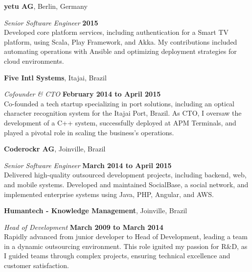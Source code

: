 \documentclass[12pt]{article}
\newcommand{\halfblankline}{\quad\vspace{-0.5\baselineskip}\pagebreak[3]}
\begin{document}
\textbf{yetu AG},
Berlin, Germany
\begin{outerlist}

    \item[] \textit{Senior Software Engineer}%
            \hfill \textbf{2015}\\
            Developed core platform services, including authentication for a Smart TV platform, using Scala, Play Framework, and Akka. My contributions included automating operations with Ansible and optimizing deployment strategies for cloud environments.

\end{outerlist}

\halfblankline

\textbf{Five Intl Systems},
Itajai, Brazil
\begin{outerlist}

    \item[] \textit{Cofounder \& CTO}%
            \hfill \textbf{February 2014 to April 2015}\\
            Co-founded a tech startup specializing in port solutions, including an optical character recognition system for the Itajai Port, Brazil. As CTO, I oversaw the development of a C++ system, successfully deployed at APM Terminals, and played a pivotal role in scaling the business's operations.
            
\end{outerlist}

\halfblankline

\textbf{Coderockr AG},
Joinville, Brazil
\begin{outerlist}

    \item[] \textit{Senior Software Engineer}%
            \hfill \textbf{March 2014 to April 2015}\\
            Delivered high-quality outsourced development projects, including backend, web, and mobile systems. Developed and maintained SocialBase, a social network, and implemented enterprise systems using Java, PHP, Angular, and AWS.
            
\end{outerlist}

\halfblankline

\textbf{Humantech - Knowledge Management},
Joinville, Brazil
\begin{outerlist}

    \item[] \textit{Head of Development}%
            \hfill \textbf{March 2009 to March 2014}\\
            Rapidly advanced from junior developer to Head of Development, leading a team in a dynamic outsourcing environment. This role ignited my passion for R\&D, as I guided teams through complex projects, ensuring technical excellence and customer satisfaction.

\end{outerlist}
\end{document}
